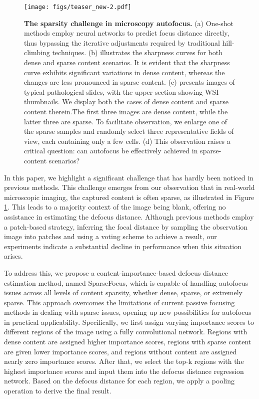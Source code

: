 \begin{figure}[t]
    \centering
    \texttt{[image: figs/teaser\_new-2.pdf]}
    \caption{\textbf{The sparsity challenge in microscopy autofocus.} 
    (a) One-shot methods employ neural networks to predict focus distance directly, thus bypassing the iterative adjustments required by traditional hill-climbing techniques.
    (b) illustrates the sharpness curves for both dense and sparse content scenarios. It is evident that the sharpness curve exhibits significant variations in dense content, whereas the changes are less pronounced in sparse content.
    (c) presents images of typical pathological slides, with the upper section showing WSI thumbnails. We display both the cases of dense content and sparse content therein.The first three images are dense content, while the latter three are sparse. To facilitate observation, we enlarge one of the sparse samples and randomly select three representative fields of view, each containing only a few cells.
    (d) This observation raises a critical question: can autofocus be effectively achieved in sparse-content scenarios? }
    \label{fig:teaser}
\end{figure}

In this paper, we highlight a significant challenge that has hardly been noticed in previous methods. This challenge emerges from our observation that in real-world microscopic imaging, the captured content is often sparse, as illustrated in Figure \ref{fig:teaser}. This leads to a majority context of the image being blank, offering no assistance in estimating the defocus distance. Although previous methods employ a patch-based strategy, inferring the focal distance by sampling the observation image into patches and using a voting scheme to achieve a result, our experiments indicate a substantial decline in performance when this situation arises.

To address this, we propose a content-importance-based defocus distance estimation method, named SparseFocus, which is capable of handling autofocus issues across all levels of content sparsity, whether dense, sparse, or extremely sparse. 
This approach overcomes the limitations of current passive focusing methods in dealing with sparse issues, opening up new possibilities for autofocus in practical applicability.
Specifically, we first assign varying importance scores to different regions of the image using a fully convolutional network. Regions with dense content are assigned higher importance scores, regions with sparse content are given lower importance scores, and regions without content are assigned nearly zero importance scores.
After that, we select the top-k regions with the highest importance scores and input them into the defocus distance regression network. 
Based on the defocus distance for each region, we apply a pooling operation to derive the final result.

